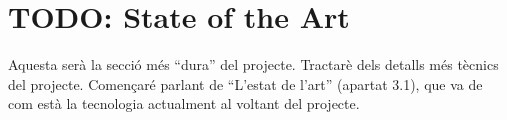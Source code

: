 
\section{TODO: State of the Art}

Aquesta serà la secció més ``dura'' del projecte. Tractarè dels detalls més
tècnics del projecte. Començaré parlant de ``L'estat de l'art'' (apartat 3.1),
que va de com està la tecnologia actualment al voltant del projecte.
